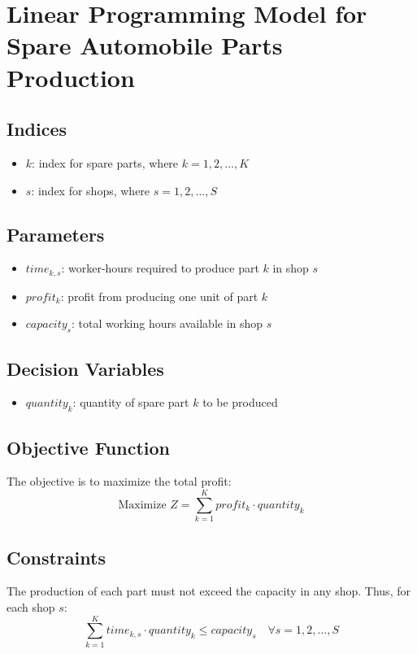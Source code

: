 \documentclass{article}
\begin{document}
\section*{Linear Programming Model for Spare Automobile Parts Production}

\subsection*{Indices}
\begin{itemize}
    \item \( k \): index for spare parts, where \( k = 1, 2, \ldots, K \)
    \item \( s \): index for shops, where \( s = 1, 2, \ldots, S \)
\end{itemize}

\subsection*{Parameters}
\begin{itemize}
    \item \( time_{k,s} \): worker-hours required to produce part \( k \) in shop \( s \)
    \item \( profit_k \): profit from producing one unit of part \( k \)
    \item \( capacity_s \): total working hours available in shop \( s \)
\end{itemize}

\subsection*{Decision Variables}
\begin{itemize}
    \item \( quantity_k \): quantity of spare part \( k \) to be produced
\end{itemize}

\subsection*{Objective Function}
The objective is to maximize the total profit:
\[
\text{Maximize } Z = \sum_{k=1}^{K} profit_k \cdot quantity_k
\]

\subsection*{Constraints}
The production of each part must not exceed the capacity in any shop. Thus, for each shop \( s \):
\[
\sum_{k=1}^{K} time_{k,s} \cdot quantity_k \leq capacity_s \quad \forall s = 1, 2, \ldots, S
\]
\end{document}
